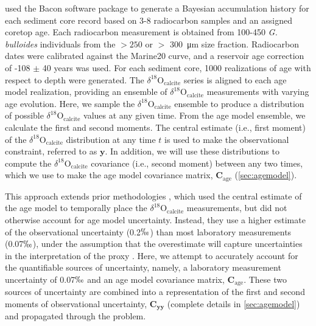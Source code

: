 \documentclass[draft]{agujournal2019}
\begin{document}
 used the Bacon software package
\cite{Bacon, McKay-Emile-Geay-2021:R} to generate a Bayesian
accumulation history for each sediment core record based on 3-8
radiocarbon samples and an assigned coretop age. Each radiocarbon measurement
 is obtained from 100-450 \textit{G. bulloides} individuals from the $> 250$ or
 $>$ \qty{300}{\micro\meter} size fraction. Radiocarbon dates were calibrated against the
 Marine20 curve, and a reservoir age correction of -108 $\pm$ 40 years was used.
 For each sediment core, 1000 realizations of age with respect to depth were generated.
The $\delta^{18}\mathrm{O}_{\mathrm{calcite}}$ series is aligned to each
age model realization, providing an
ensemble of $\delta^{18}\mathrm{O}_{\mathrm{calcite}}$ measurements with
varying age evolution. Here, we sample the
$\delta^{18}\mathrm{O}_{\mathrm{calcite}}$ ensemble to produce a
distribution of possible $\delta^{18}\mathrm{O}_{\mathrm{calcite}}$ values
at any given time. From the age model ensemble, we calculate the first
and second moments. The central estimate (i.e., first moment) of the
$\delta^{18}\mathrm{O}_{\mathrm{calcite}}$ distribution at any time
$t$ is used to make the observational constraint, referred
to as $\mathbf{y}$. In addition, we will use these distributions to
compute the $\delta^{18}\mathrm{O}_{\mathrm{calcite}}$ covariance (i.e.,
second moment) between any two times, which we use
to make the age model covariance matrix, $\mathbf{C}_{\mathrm{age}}$
(\ref{sec:agemodel}).

This approach extends prior methodologies
\cite[]{LeGrand-Wunsch-1995:Constraints, Gebbie2006,
  Marchal-Curry-2008:Abyssal, Amrhein-Gebbie-2015:Inferring}, which
used the central estimate of the age model to temporally place the
$\delta^{18}\mathrm{O}_{\mathrm{calcite}}$ measurements, but did not
otherwise account for age model uncertainty. Instead, they use a
higher estimate of the observational uncertainty (0.2$\permil$) than
most laboratory measurements (0.07$\permil$), under the assumption
that the overestimate will capture uncertainties in the interpretation
of the proxy \cite{Gebbie2006}. Here, we attempt to accurately account
for the quantifiable sources of uncertainty, namely, a laboratory
measurement uncertainty of 0.07$\permil$ \cite[]{Lu-Oppo-2023:Surface}
and an age model covariance matrix, $\mathbf{C}_{\mathrm{age}}$. These
two sources of uncertainty are combined into a representation of the
first and second moments of observational uncertainty,
$\mathbf{C_{yy}}$ (complete details in \ref{sec:agemodel}) and
propagated through the problem.
\end{document}
